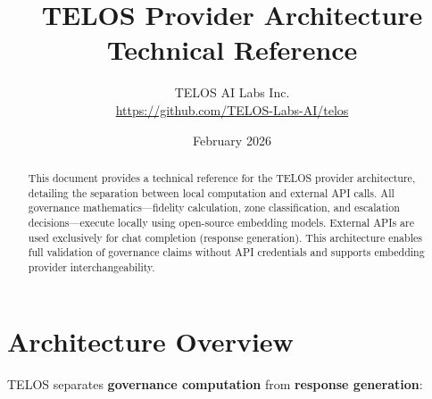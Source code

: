 \documentclass[11pt,twocolumn]{article}
\title{TELOS Provider Architecture\\Technical Reference}
\author{TELOS AI Labs Inc.\\[4pt]\url{https://github.com/TELOS-Labs-AI/telos}}
\date{February 2026}
\begin{document}
\maketitle

\begin{abstract}
This document provides a technical reference for the TELOS provider architecture, detailing the separation between local computation and external API calls. All governance mathematics---fidelity calculation, zone classification, and escalation decisions---execute locally using open-source embedding models. External APIs are used exclusively for chat completion (response generation). This architecture enables full validation of governance claims without API credentials and supports embedding provider interchangeability.
\end{abstract}

\section{Architecture Overview}

TELOS separates \textbf{governance computation} from \textbf{response generation}:

\begin{center}
\end{center}
\end{document}
